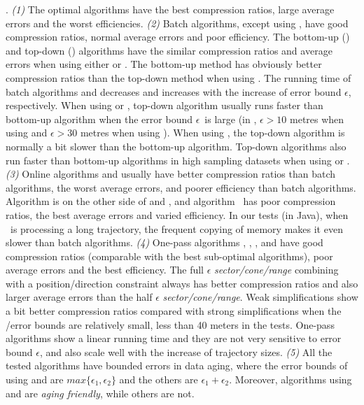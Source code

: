 {.
\emph{(1)} The optimal algorithms have the best compression ratios, large average errors and the worst efficiencies.
%
\emph{(2)} Batch algorithms, except \dpa using \dad, have good compression ratios, normal average errors and poor efficiency.
%
The bottom-up (\tpa) and top-down (\dpa) algorithms have the similar compression ratios and average errors when using either \ped or \sed. The bottom-up method has obviously better compression ratios than the top-down method when using \dad.
%
The running time of batch algorithms \dpa and \tpa decreases and increases with the increase of error bound $\epsilon$, respectively. When using \ped or \sed, top-down algorithm \dpa usually runs faster than bottom-up algorithm \tpa when the error bound $\epsilon$~is large  (\eg in \geolife, $\epsilon >10$ metres when using \ped and $\epsilon >30$ metres when using \sed). When using \dad, the top-down algorithm is normally a bit slower than the bottom-up algorithm.
Top-down algorithms also run faster than bottom-up algorithms in high sampling datasets when using \ped or \sed.
%
\emph{(3)} Online algorithms \opwa and \bqsa usually have better compression ratios than batch algorithms, the worst average errors, and poorer efficiency than batch algorithms. Algorithm \squishe is on the other side of \opwa and \bqsa,
{and algorithm \dagots~has poor compression ratios, the best average errors and varied efficiency. In our tests (in Java), when \dagots~is processing a long trajectory, the frequent copying of memory makes it even slower than batch algorithms.}
%
\emph{(4)} One-pass algorithms \operb, \siped, \cised, \intersec and \interval have good compression ratios (comparable with the best sub-optimal algorithms), poor average errors and the best efficiency.
%
The full $\epsilon$ \emph{sector/cone/range} combining with a position/direction constraint always has better compression ratios and also larger average errors than the half $\epsilon$ \emph{sector/cone/range}. %
%
{Weak simplifications show a bit better compression ratios compared with strong simplifications when the \sed/\ped error bounds are relatively small, \eg less than 40 meters in the tests.}
One-pass algorithms show a linear running time and they are not very sensitive to error bound $\epsilon$, and also scale well with the increase of trajectory sizes.
%
\emph{(5)} {All the tested algorithms have bounded errors in data aging, where the error bounds of \dpa using \ped and \sed are $max\{\epsilon_1, \epsilon_2\}$ and the others are $\epsilon_1 + \epsilon_2$. Moreover, algorithms \dpa using \ped and \sed are \emph{aging friendly}, while others are not. }


}
